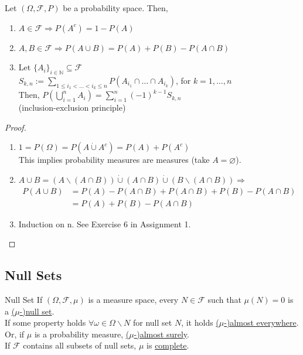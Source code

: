 \documentclass{article}
\begin{document}
	\begin{myprop}{}{}
		Let $(\Omega, \mathcal{F}, P)$ be a probability space. Then,
		\begin{enumerate}
			\item $A\in\mathcal{F}\Rightarrow P(A^c)=1-P(A)$
			\item $A, B\in\mathcal{F}\Rightarrow P(A\cup B)=P(A)+P(B)-P(A\cap B)$
			\item Let $\{A_i\}_{i\in\mathbb{N}}\subseteq\mathcal{F}$\\
			$S_{k, n}:=\sum_{1\leq i_1<\dots<i_k\leq n}P(A_{i_1}\cap\dots\cap A_{i_k})$, for $k=1,\dots,n$\\
			
			Then, $P(\bigcup_{i=1}^{n}A_i)=\sum_{i=1}^{n}(-1)^{k-1}S_{k, n}$\\
			
			(inclusion-exclusion principle)
		\end{enumerate}
		
		\begin{proof}~\\
		\begin{enumerate}
			\item $1=P(\Omega)=P(A\dot\cup A^c)=P(A)+P(A^c)$\\
			
			This implies probability measures are measures (take $A=\varnothing$).
			\item $A\cup B=(A\backslash(A\cap B))\dot\cup(A\cap B)\dot\cup(B\backslash(A\cap B))\Rightarrow$
			\begin{align*}
				P(A\cup B)&=P(A)-P(A\cap B)+P(A\cap B)+P(B)-P(A\cap B)\\
				&=P(A)+P(B)-P(A\cap B)
			\end{align*}
			\item Induction on n. See Exercise 6 in Assignment 1.
		\end{enumerate}
	\end{proof}
	\end{myprop}
	
	\newpage\subsection{Null Sets}	
	
	\begin{mydef}{Null Set}{}
		If $(\Omega, \mathcal{F}, \mu)$ is a measure space, every $N\in\mathcal{F}$ such that $\mu(N)=0$ is a \underline{($\mu$-)null set}.\\
		
		If some property holds $\forall\omega\in\Omega\backslash N$ for null set $N$, it holds \underline{($\mu$-)almost everywhere}.\\
		
		Or, if $\mu$ is a probability measure, \underline{($\mu$-)almost surely}.\\
		
		If $\mathcal{F}$ contains all subsets of null sets, $\mu$ is \underline{complete}.
	\end{mydef}
	
\end{document}
